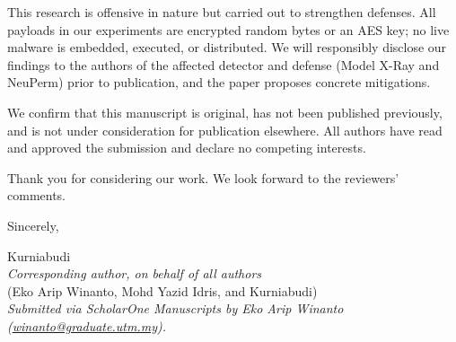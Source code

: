 \documentclass[11pt]{article}
\begin{document}
This research is offensive in nature but carried out to strengthen defenses. All
payloads in our experiments are encrypted random bytes or an AES key; no live malware is
embedded, executed, or distributed. We will responsibly disclose our findings to the
authors of the affected detector and defense (Model X-Ray and NeuPerm) prior to
publication, and the paper proposes concrete mitigations.

We confirm that this manuscript is original, has not been published previously, and is
not under consideration for publication elsewhere. All authors have read and approved
the submission and declare no competing interests.

Thank you for considering our work. We look forward to the reviewers' comments.

\vspace{1em}
\noindent Sincerely,

\vspace{1.5em}
\noindent Kurniabudi\\
\emph{Corresponding author, on behalf of all authors}\\
(Eko Arip Winanto, Mohd Yazid Idris, and Kurniabudi)\\[0.3em]
\emph{Submitted via ScholarOne Manuscripts by Eko Arip Winanto
(\href{mailto:winanto@graduate.utm.my}{winanto@graduate.utm.my}).}
\end{document}
